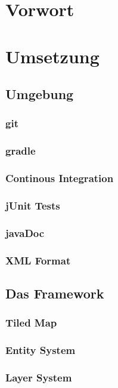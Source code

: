 \section{Vorwort}
\section{Umsetzung}
	\subsection{Umgebung}
		\subsubsection{git}
		\subsubsection{gradle}
		\subsubsection{Continous Integration}
		\subsubsection{jUnit Tests}
		\subsubsection{javaDoc}
		\subsubsection{XML Format}
	\subsection{Das Framework}
		\subsubsection{Tiled Map}
		\subsubsection{Entity System}
		\subsubsection{Layer System}
